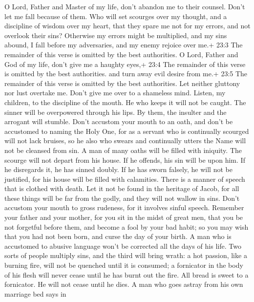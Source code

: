  O Lord, Father and Master of my life, don't abandon me to
their counsel. Don't let me fall because of them.  Who will
set scourges over my thought, and a discipline of wisdom over my heart,
that they spare me not for my errors, and not overlook their sins?
 Otherwise my errors might be multiplied, and my sins
abound, I fall before my adversaries, and my enemy rejoice over me.+
23:3 The remainder of this verse is omitted by the best authorities.
 O Lord, Father and God of my life, don't give me a haughty
eyes,+ 23:4 The remainder of this verse is omitted by the best
authorities.  and turn away evil desire from me.+ 23:5 The
remainder of this verse is omitted by the best authorities. 
Let neither gluttony nor lust overtake me. Don't give me over to a
shameless mind.  Listen, my children, to the discipline of
the mouth. He who keeps it will not be caught.  The sinner
will be overpowered through his lips. By them, the insulter and the
arrogant will stumble.  Don't accustom your mouth to an
oath, and don't be accustomed to naming the Holy One,  for
as a servant who is continually scourged will not lack bruises, so he
also who swears and continually utters the Name will not be cleansed
from sin.  A man of many oaths will be filled with
iniquity. The scourge will not depart from his house. If he offends, his
sin will be upon him. If he disregards it, he has sinned doubly. If he
has sworn falsely, he will not be justified, for his house will be
filled with calamities.  There is a manner of speech that
is clothed with death. Let it not be found in the heritage of Jacob, for
all these things will be far from the godly, and they will not wallow in
sins.  Don't accustom your mouth to gross rudeness, for it
involves sinful speech.  Remember your father and your
mother, for you sit in the midst of great men, that you be not forgetful
before them, and become a fool by your bad habit; so you may wish that
you had not been born, and curse the day of your birth.  A
man who is accustomed to abusive language won't be corrected all the
days of his life.  Two sorts of people multiply sins, and
the third will bring wrath: a hot passion, like a burning fire, will not
be quenched until it is consumed; a fornicator in the body of his flesh
will never cease until he has burnt out the fire.  All
bread is sweet to a fornicator. He will not cease until he dies.
 A man who goes astray from his own marriage bed says in
